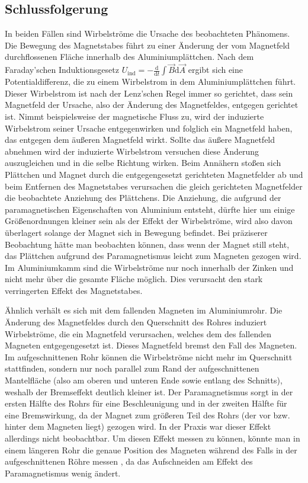 \documentclass[
	a4paper,
	12pt,
	pagesize,
	ngerman
]{scrartcl}
\begin{document}
	\subsection{Schlussfolgerung}
	In beiden Fällen sind Wirbelströme die Ursache des beobachteten Phänomens.
	Die Bewegung des Magnetstabes führt zu einer Änderung der vom Magnetfeld durchflossenen Fläche innerhalb des Aluminiumplättchen. Nach dem Faraday'schen Induktionsgesetz $U_\text{ind}= - \frac{\text{d}}{\text{d}t} \int \vec{B} \text{d} \vec{A}$ ergibt sich eine Potentialdifferenz, die zu einem Wirbelstrom in dem Aluminiumplättchen führt. Dieser Wirbelstrom ist nach der Lenz'schen Regel immer so gerichtet, dass sein Magnetfeld der Ursache, also der Änderung des Magnetfeldes, entgegen gerichtet ist. %
	Nimmt beispielsweise der magnetische Fluss zu, wird der induzierte Wirbelstrom seiner Ursache entgegenwirken und folglich ein Magnetfeld haben, das entgegen dem äußeren Magnetfeld wirkt. Sollte das äußere Magnetfeld abnehmen wird der induzierte Wirbelstrom versuchen diese Änderung auszugleichen und in die selbe Richtung wirken. 
	Beim Annähern stoßen sich Plättchen und Magnet durch die entgegengesetzt gerichteten Magnetfelder ab und beim Entfernen des Magnetstabes verursachen die gleich gerichteten Magnetfelder die beobachtete Anziehung des Plättchens. 
	Die Anziehung, die aufgrund der paramagnetischen Eigenschaften von Aluminium entsteht, dürfte hier um einige Größenordnungen kleiner sein als der Effekt der Wirbelströme, wird also davon überlagert solange der Magnet sich in Bewegung befindet. Bei präziserer Beobachtung hätte man beobachten können, dass wenn der Magnet still steht, das Plättchen aufgrund des Paramagnetismus leicht zum Magneten gezogen wird.
	Im Aluminiumkamm sind die Wirbelströme nur noch innerhalb der Zinken und nicht mehr über die gesamte Fläche möglich. Dies verursacht den stark verringerten Effekt des Magnetstabes. \par
	Ähnlich verhält es sich mit dem fallenden Magneten im Aluminiumrohr. Die Änderung des Magnetfeldes durch den Querschnitt des Rohres induziert Wirbelströme, die ein Magnetfeld verursachen, welches dem des fallenden Magneten entgegengesetzt ist. Dieses Magnetfeld bremst den Fall des Magneten. Im aufgeschnittenen Rohr können die Wirbelströme nicht mehr im Querschnitt stattfinden, sondern nur noch parallel zum Rand der aufgeschnittenen Mantelfläche (also am oberen und unteren Ende sowie entlang des Schnitts), weshalb der Bremseffekt deutlich kleiner ist.
	Der Paramagnetismus sorgt in der ersten Hälfte des Rohrs für eine Beschleunigung und in der zweiten Hälfte für eine Bremswirkung, da der Magnet zum größeren Teil des Rohrs (der vor bzw. hinter dem Magneten liegt) gezogen wird. In der Praxis war dieser Effekt allerdings nicht beobachtbar. Um diesen Effekt messen zu können, könnte man in einem längeren Rohr die genaue Position des Magneten während des Falls in der aufgeschnittenen Röhre messen , da das Aufschneiden am Effekt des Paramagnetismus wenig ändert. \newline 
	
\end{document}

